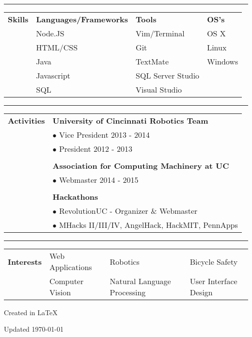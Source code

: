 \documentclass[11pt]{article} %
\begin{document}
\begin{small}
			\vspace*{1\baselineskip}\hrule\vspace*{1\baselineskip}
			
			\begin{tabular}[t]{p{3cm}p{4cm}p{5cm}p{4cm}}\large{\textbf{Skills}} 	
				& \textbf{Languages/Frameworks}	& \textbf{Tools}& \textbf{OS's} 		\\ 
				& Node.JS 				& Vim/Terminal 			& OS X 		\\
				& HTML/CSS				& Git					& Linux	  	\\
				& Java     					& TextMate 			& Windows	\\
				& Javascript				& SQL Server Studio 	& 			\\
				& SQL					& Visual Studio			& 			\\
			\end{tabular}
			
			\vspace*{1\baselineskip}\hrule\vspace*{1\baselineskip}		
			
			\begin{tabular}[t]{p{3cm} p{16cm}}\large{\textbf{Activities}}
					& \textbf{University of Cincinnati Robotics Team}	\\
					& $\bullet$ Vice President 2013 - 2014					\\
					& $\bullet$ President 2012 - 2013						\\
					& \\
					& \textbf{Association for Computing Machinery at UC}\\
					& $\bullet$ Webmaster 2014 - 2015 \\
					& \\
					& \textbf{Hackathons} \\
					& $\bullet$ RevolutionUC - Organizer \& Webmaster \\
					& $\bullet$ MHacks II/III/IV, AngelHack, HackMIT, PennApps \\ 	
			\end{tabular}
			
			\vspace*{1\baselineskip}\hrule\vspace*{1\baselineskip}
			
			\begin{tabular}[t]{p{3cm} p{4cm}p{5cm}p{5cm}}\large{\textbf{Interests}}
				& Web Applications		& Robotics				  	& Bicycle Safety   		\\
				& Computer Vision		& Natural Language Processing	& User Interface Design	\\
			\end{tabular}
		
			\vspace*{9\baselineskip}
	
			\centerline{Created in \LaTeX}
			\centerline{\scriptsize{Updated \today}}
		\end{small}
\end{document}
